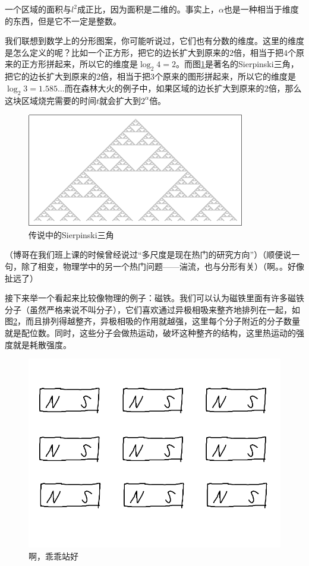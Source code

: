 一个区域的面积与$l^2$成正比，因为面积是二维的。事实上，$\alpha$也是一种相当于维度的东西，但是它不一定是整数。

我们联想到数学上的分形图案，你可能听说过，它们也有分数的维度。这里的维度是怎么定义的呢？比如一个正方形，把它的边长扩大到原来的$2$倍，相当于把$4$个原来的正方形拼起来，所以它的维度是$\log_2 4=2$。而图\ref{fig-sierpinski}是著名的Sierpinski三角，把它的边长扩大到原来的$2$倍，相当于把$3$个原来的图形拼起来，所以它的维度是$\log_2 3=1.585 \dots$而在森林大火的例子中，如果区域的边长扩大到原来的$2$倍，那么这块区域烧完需要的时间$t$就会扩大到$2^{\alpha}$倍。
\begin{figure}[htb]
\centering
\includegraphics[scale=1]{fig/sierpinski.png}
\caption{传说中的Sierpinski三角}
\label{fig-sierpinski}
\end{figure}

（博哥在我们班上课的时候曾经说过“多尺度是现在热门的研究方向”）（顺便说一句，除了相变，物理学中的另一个热门问题——湍流，也与分形有关）（啊。。好像扯远了）

接下来举一个看起来比较像物理的例子：磁铁。我们可以认为磁铁里面有许多磁铁分子（虽然严格来说不叫分子），它们喜欢通过异极相吸来整齐地排列在一起，如图\ref{fig-magnet-mole}，而且排列得越整齐，异极相吸的作用就越强，这里每个分子附近的分子数量就是配位数。同时，这些分子会做热运动，破坏这种整齐的结构，这里热运动的强度就是耗散强度。
\begin{figure}[htb]
\centering
\includegraphics[scale=0.5]{fig/magnet-mole.png}
\caption{啊，乖乖站好}
\label{fig-magnet-mole}
\end{figure}

